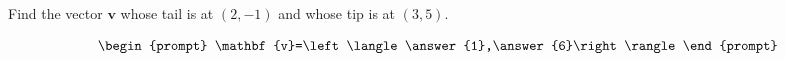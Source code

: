 \documentclass{ximera}
\author{Gregory Hartman \and Matthew Carr}
\begin{document}
\begin{exercise}



Find the vector $\mathbf{v}$ whose tail is at $(2,-1)$ and whose tip is at $(3,5)$.

\[
\begin{prompt}
\mathbf{v}=\left\langle\answer{1},\answer{6}\right\rangle
\end{prompt}
\]

\end{exercise}
\end{document}

